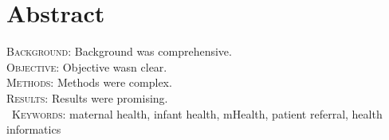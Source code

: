 \section{Abstract}
\textsc{Background:} Background was comprehensive.\\
\textsc{Objective:} Objective wasn clear. \\
\textsc{Methods:} Methods were complex.\\
\textsc{Results:} Results were promising. \\\
\textsc{Keywords:} maternal health, infant health, mHealth, patient referral, health informatics